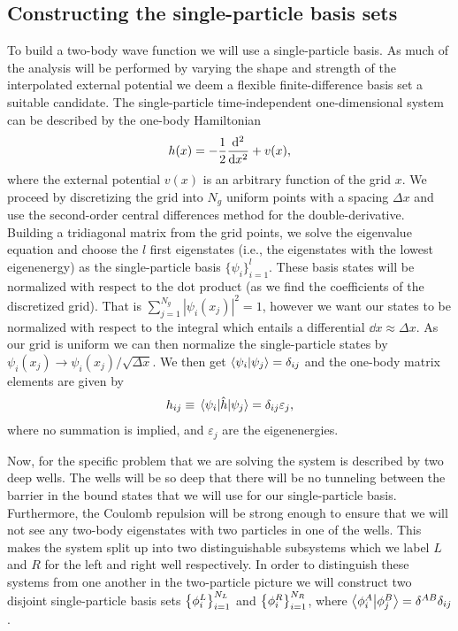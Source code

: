 \documentclass[twocolumn,superscriptaddress,unsortedaddress,
 amsmath,amssymb,
 aps,
]{revtex4-2}
\begin{document}
    \subsection{Constructing the single-particle basis sets}
        To build a two-body wave function we will use a single-particle basis.
        As much of the analysis will be performed by varying the shape and
        strength of the interpolated external potential we deem a flexible
        finite-difference basis set a suitable candidate.
        The single-particle time-independent one-dimensional system can be
        described by the one-body Hamiltonian
        \begin{align}
            h(x) = -\frac{1}{2}\dv[2]{}{x}
            + v(x),
        \end{align}
        where the external potential $v(x)$ is an arbitrary function of the grid $x$.
        We proceed by discretizing the grid into $N_g$ uniform points with a spacing
        $\Delta x$ and use the second-order central differences method for the
        double-derivative.
        Building a tridiagonal matrix from the grid points, we solve the eigenvalue
        equation and choose the $l$ first eigenstates (i.e., the eigenstates with the
        lowest eigenenergy) as the single-particle basis $\{\psi_i\}_{i = 1}^l$.
        These basis states will be normalized with respect to the dot product (as we
        find the coefficients of the discretized grid).
        That is $\sum_{j = 1}^{N_g} | \psi_i(x_j) |^{2} = 1$, however we want our
        states to be normalized with respect to the integral which entails a
        differential $\dd{x} \approx \Delta x$.
        As our grid is uniform we can then normalize the single-particle states
        by $\psi_i(x_j) \to \psi_i(x_j) / \sqrt{\Delta x}$.
        We then get $\braket{\psi_i}{\psi_j} = \delta_{ij}$ and the one-body matrix
        elements are given by
        \begin{align}
            h_{ij} \equiv \mel{\psi_i}{\hat{h}}{\psi_j}
            = \delta_{ij}\varepsilon_j,
        \end{align}
        where no summation is implied, and $\varepsilon_j$ are the eigenenergies.

        Now, for the specific problem that  we are solving the system is described
        by two deep wells.
        The wells will be so deep that there will be no tunneling between the
        barrier in the bound states that we will use for our single-particle
        basis.
        Furthermore, the Coulomb repulsion will be strong enough to ensure that
        we will not see any two-body eigenstates with two particles in one of
        the wells.
        This makes the system split up into two distinguishable subsystems
        which we label $L$ and $R$ for the left and right well respectively.
        In order to distinguish these systems from one another in the
        two-particle picture we will construct two disjoint single-particle
        basis sets $\qty{\phi^{L}_{i}}_{i = 1}^{N_L}$ and
        $\qty{\phi^{R}_{i}}_{i = 1}^{N_R}$, where
        $\braket{\phi^{A}_{i}}{\phi^{B}_{j}} = \delta^{AB} \delta_{ij}$.
   
\end{document}
